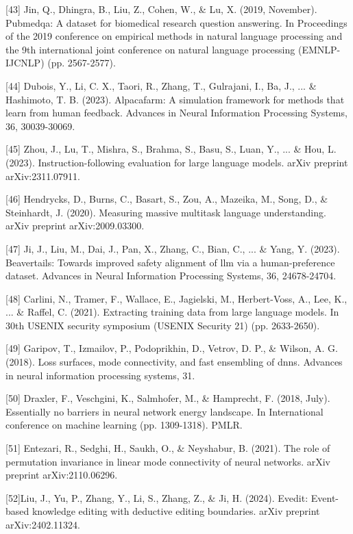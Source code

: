 \documentclass{article}
\begin{document}
{[43] Jin, Q., Dhingra, B., Liu, Z., Cohen, W., \& Lu, X. (2019, November). Pubmedqa: A dataset for biomedical research question answering. In Proceedings of the 2019 conference on empirical methods in natural language processing and the 9th international joint conference on natural language processing (EMNLP-IJCNLP) (pp. 2567-2577).

[44] Dubois, Y., Li, C. X., Taori, R., Zhang, T., Gulrajani, I., Ba, J., ... \& Hashimoto, T. B. (2023). Alpacafarm: A simulation framework for methods that learn from human feedback. Advances in Neural Information Processing Systems, 36, 30039-30069.

[45] Zhou, J., Lu, T., Mishra, S., Brahma, S., Basu, S., Luan, Y., ... \& Hou, L. (2023). Instruction-following evaluation for large language models. arXiv preprint arXiv:2311.07911.

[46] Hendrycks, D., Burns, C., Basart, S., Zou, A., Mazeika, M., Song, D., \& Steinhardt, J. (2020). Measuring massive multitask language understanding. arXiv preprint arXiv:2009.03300.

[47] Ji, J., Liu, M., Dai, J., Pan, X., Zhang, C., Bian, C., ... \& Yang, Y. (2023). Beavertails: Towards improved safety alignment of llm via a human-preference dataset. Advances in Neural Information Processing Systems, 36, 24678-24704.

[48] Carlini, N., Tramer, F., Wallace, E., Jagielski, M., Herbert-Voss, A., Lee, K., ... \& Raffel, C. (2021). Extracting training data from large language models. In 30th USENIX security symposium (USENIX Security 21) (pp. 2633-2650).

[49] Garipov, T., Izmailov, P., Podoprikhin, D., Vetrov, D. P., \& Wilson, A. G. (2018). Loss surfaces, mode connectivity, and fast ensembling of dnns. Advances in neural information processing systems, 31.

[50] Draxler, F., Veschgini, K., Salmhofer, M., \& Hamprecht, F. (2018, July). Essentially no barriers in neural network energy landscape. In International conference on machine learning (pp. 1309-1318). PMLR.

[51] Entezari, R., Sedghi, H., Saukh, O., \& Neyshabur, B. (2021). The role of permutation invariance in linear mode connectivity of neural networks. arXiv preprint arXiv:2110.06296.

[52]Liu, J., Yu, P., Zhang, Y., Li, S., Zhang, Z., \& Ji, H. (2024). Evedit: Event-based knowledge editing with deductive editing boundaries. arXiv preprint arXiv:2402.11324.

}
\end{document}
